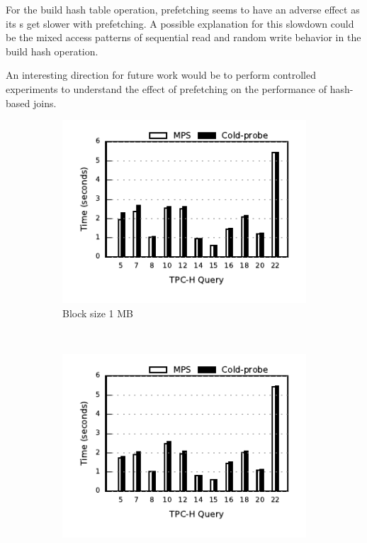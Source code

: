 For the build hash table operation, prefetching seems to have an adverse effect as its \wo{}s get slower with prefetching.
A possible explanation for this slowdown could be the mixed access patterns of sequential read and random write behavior in the build hash operation.

An interesting direction for future work would be to perform controlled experiments to understand the effect 
of prefetching on the performance of hash-based joins.

\begin{figure}[ht]
	\centering
	\begin{subfigure}[ht]{0.32\textwidth}
		\includegraphics[width=\textwidth]{pipeline/figures/coldprobe-sequence-20threads-tpch-sf50-bs1mb-withlip-colstore}	
		\caption{Block size 1 MB}
	\end{subfigure}
	~
	\begin{subfigure}[ht]{0.32\textwidth}
		\includegraphics[width=\textwidth]{pipeline/figures/coldprobe-sequence-20threads-tpch-sf50-bs2mb-withlip-colstore}	

\end{subfigure}
\end{figure}
